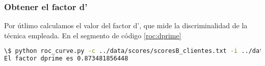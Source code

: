 \subsubsection{Obtener el factor d'}
Por útlimo calculamos el valor del factor d', que mide la discriminalidad de la técnica empleada. En el segmento de código \ref{roc:dprime} 

\begin{lstlisting}[language=bash,label=roc:dprime,caption=Calculo del factor d-prime]
\$ python roc_curve.py -c ../data/scores/scoresB_clientes.txt -i ../data/scores/scoresB_impostores.txt  -d -s dprime
El factor dprime es 0.873481856448
\end{lstlisting}
